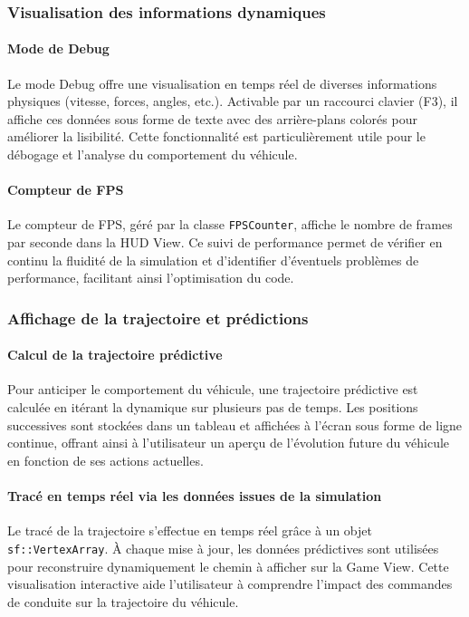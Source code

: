 \subsubsection{Visualisation des informations dynamiques}\label{subsubsec:visualisation-des-informations-dynamiques}

\paragraph{Mode de Debug}
Le mode Debug offre une visualisation en temps réel de diverses informations physiques (vitesse, forces, angles, etc.). Activable par un raccourci clavier (F3), il affiche ces données sous forme de texte avec des arrière-plans colorés pour améliorer la lisibilité.
Cette fonctionnalité est particulièrement utile pour le débogage et l'analyse du comportement du véhicule.

\paragraph{Compteur de FPS}
Le compteur de FPS, géré par la classe \texttt{FPSCounter}, affiche le nombre de frames par seconde dans la HUD View.
Ce suivi de performance permet de vérifier en continu la fluidité de la simulation et d'identifier d'éventuels problèmes de performance, facilitant ainsi l'optimisation du code.

\subsubsection{Affichage de la trajectoire et prédictions}\label{subsubsec:affichage-de-la-trajectoire-et-predictions}

\paragraph{Calcul de la trajectoire prédictive}
Pour anticiper le comportement du véhicule, une trajectoire prédictive est calculée en itérant la dynamique sur plusieurs pas de temps.
Les positions successives sont stockées dans un tableau et affichées à l'écran sous forme de ligne continue, offrant ainsi à l'utilisateur un aperçu de l'évolution future du véhicule en fonction de ses actions actuelles.

\paragraph{Tracé en temps réel via les données issues de la simulation}
Le tracé de la trajectoire s'effectue en temps réel grâce à un objet \texttt{sf::VertexArray}.
À chaque mise à jour, les données prédictives sont utilisées pour reconstruire dynamiquement le chemin à afficher sur la Game View.
Cette visualisation interactive aide l'utilisateur à comprendre l'impact des commandes de conduite sur la trajectoire du véhicule.

